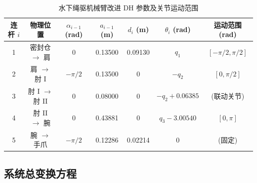 \begin{table}[htbp]
    \centering
    \caption{水下绳驱机械臂改进 DH 参数及关节运动范围}
    \label{tab:dh_params_with_limits}
    \begin{tabular}{ccccccc}
    \toprule[2pt]   %
    连杆 $i$ & 物理位置 & $\alpha_{i-1}$ (rad) & $a_{i-1}$ (m) & $d_i$ (m) & $\theta_i$ (rad) & 运动范围 (rad) \\
    \midrule
    1 & 密封仓 $\to$ 肩 & 0 & 0.13500 & 0.09130 & $q_1$ & $[-\pi/2, \pi/2]$ \\
    2 & 肩 $\to$ 肘 I & $-\pi/2$ & 0.13500 & 0 & $-q_2$ & $[0, \pi/2]$ \\
    3 & 肘 I $\to$ 肘 II & 0 & 0.08000 & 0 & $-q_2 + 0.06385$ & (联动关节) \\
    4 & 肘 II $\to$ 腕 & 0 & 0.43881 & 0 & $q_3 - 3.00540$ & $[0, \pi]$ \\
    5 & 腕 $\to$ 手爪 & $-\pi/2$ & 0.12286 & 0.02214 & 0 & (固定) \\
    \bottomrule[2pt] %
    \end{tabular}
\end{table}





\subsection{系统总变换方程}

